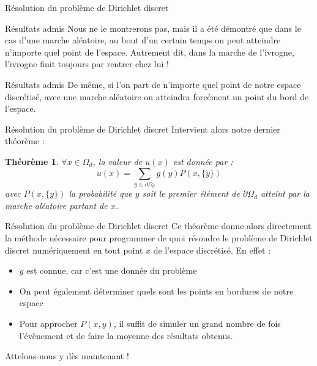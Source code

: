 \documentclass{beamer}
\newtheorem*{theo}{Théorème} %
\begin{document}
\begin{frame}{Résolution du problème de Dirichlet discret}
    \begin{block}{Résultats admis}
        Nous ne le montrerons pas, mais il a été démontré que dans le cas d'une
        marche aléatoire, au bout d'un certain temps on peut atteindre n'importe
        quel point de l'espace. Autrement dit, dans la marche de l'ivrogne,
        l'ivrogne finit toujours par rentrer chez lui !
    \end{block}

    \pause

    \begin{block}{Résultats admis}
        De même, si l'on part de n'importe quel point de notre espace discrétisé,
        avec une marche aléatoire on atteindra forcément un point du bord de
        l'espace.
    \end{block}

\end{frame}

\begin{frame}{Résolution du problème de Dirichlet discret}
    Intervient alors notre dernier théorème :

    \begin{theo}
     $\forall x \in \Omega_d$, la valeur de $u(x)$ est donnée par :
     \[
        u(x) = \sum_{y\in \partial \Omega_d} g(y) P(x, \{y\})
     \]
     avec $P(x, \{y\})$ la probabilité que $y$ soit le premier élément de $\partial \Omega_d$ atteint par la marche aléatoire partant de $x$.
\end{theo}
\end{frame}

\begin{frame}{Résolution du problème de Dirichlet discret}
    Ce théorème donne alors directement la méthode nécessaire pour programmer
    de quoi résoudre le problème de Dirichlet discret numériquement en tout
    point $x$ de l'espace discrétisé. En effet :
    \begin{itemize}
        \item $g$ est connue, car c'est une donnée du problème
        \pause
        \item On peut également déterminer quels sont les points en bordures de notre espace
        \pause
        \item Pour approcher $P(x,{y})$, il suffit de simuler un grand nombre
            de fois l'évènement et de faire la moyenne des résultats obtenus.
    \end{itemize}
    Attelons-nous y dès maintenant !
\end{frame}
\end{document}
